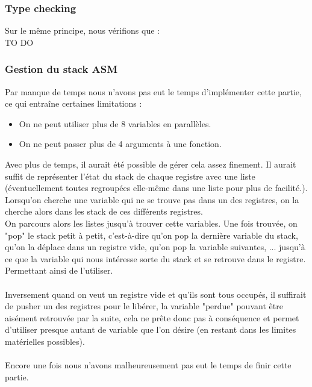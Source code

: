 \documentclass[a4paper,10pt]{article}
\begin{document}
	
	\subsubsection{Type checking}
		Sur le même principe, nous vérifions que :\\
		
		TO DO

	\subsubsection{Gestion du stack ASM}
		Par manque de temps nous n'avons pas eut le temps d'implémenter cette partie, ce qui entraîne certaines limitations : \begin{itemize}
			\item On ne peut utiliser plus de 8 variables en parallèles.
			\item On ne peut passer plus de 4 arguments à une fonction.
		\end{itemize}
		Avec plus de temps, il aurait été possible de gérer cela assez finement. Il aurait suffit de représenter l'état du stack de chaque registre avec une liste (éventuellement toutes regroupées elle-même dans une liste pour plus de facilité.). Lorsqu'on cherche une variable qui ne se trouve pas dans un des registres, on la cherche alors dans les stack de ces différents registres.\\
		On parcours alors les listes jusqu'à trouver cette variables. Une fois trouvée, on "pop" le stack petit à petit, c'est-à-dire qu'on pop la dernière variable du stack, qu'on la déplace dans un registre vide, qu'on pop la variable suivantes, ... jusqu'à ce que la variable qui nous intéresse sorte du stack et se retrouve dans le registre. Permettant ainsi de l'utiliser.\\
		~\\
		Inversement quand on veut un registre vide et qu'ils sont tous occupés, il suffirait de pusher un des registres pour le libérer, la variable "perdue" pouvant être aisément retrouvée par la suite, cela ne prête donc pas à conséquence et permet d'utiliser presque autant de variable que l'on désire (en restant dans les limites matérielles possibles).\\
		~\\
		Encore une fois nous n'avons malheureusement pas eut le temps de finir cette partie.
	
\end{document}
